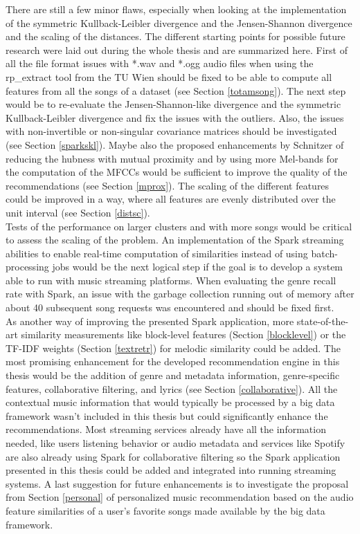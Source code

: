 There are still a few minor flaws, especially when looking at the implementation of the symmetric Kullback-Leibler divergence and the Jensen-Shannon divergence and the scaling of the distances. The different starting points for possible future research were laid out during the whole thesis and are summarized here. First of all the file format issues with *.wav and *.ogg audio files when using the rp\_extract tool from the TU Wien should be fixed to be able to compute all features from all the songs of a dataset (see Section \ref{totamsong}).
The next step would be to re-evaluate the Jensen-Shannon-like divergence and the symmetric Kullback-Leibler divergence and fix the issues with the outliers. Also, the issues with non-invertible or non-singular covariance matrices should be investigated (see Section \ref{sparkskl}). Maybe also the proposed enhancements by Schnitzer \cite{schnitzer1} of reducing the hubness with mutual proximity and by using more Mel-bands for the computation of the MFCCs would be sufficient to improve the quality of the recommendations (see Section \ref{mprox}). The scaling of the different features could be improved in a way, where all features are evenly distributed over the unit interval (see Section \ref{distsc}).\\
Tests of the performance on larger clusters and with more songs would be critical to assess the scaling of the problem.
An implementation of the Spark streaming abilities to enable real-time computation of similarities instead of using batch-processing jobs would be the next logical step if the goal is to develop a system able to run with music streaming platforms. When evaluating the genre recall rate with Spark, an issue with the garbage collection running out of memory after about 40 subsequent song requests was encountered and should be fixed first.\\
\noindent As another way of improving the presented Spark application, more state-of-the-art similarity measurements like block-level features (Section \ref{blocklevel}) or the TF-IDF weights (Section \ref{textretr}) for melodic similarity could be added. The most promising enhancement for the developed recommendation engine in this thesis would be the addition of genre and metadata information, genre-specific features, collaborative filtering, and lyrics (see Section \ref{collaborative}). All the contextual music information that would typically be processed by a big data framework wasn't included in this thesis but could significantly enhance the recommendations. Most streaming services already have all the information needed, like users listening behavior or audio metadata and services like Spotify are also already using Spark for collaborative filtering so the Spark application presented in this thesis could be added and integrated into running streaming systems. A last suggestion for future enhancements is to investigate the proposal from Section \ref{personal} of personalized music recommendation based on the audio feature similarities of a user's favorite songs made available by the big data framework.

